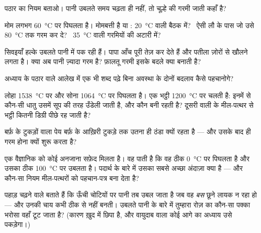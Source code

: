 \begin{exercise}[$\star$]\label{exo:g4:changes-of-state:4}
पठार का नियम बताओ। पानी उबलते समय  चढ़ता ही नहीं, तो चूल्हे की
गरमी जाती कहाँ है?
\end{exercise}

\begin{exercise}[$\star$]\label{exo:g4:changes-of-state:5}
मोम लगभग \qty{60}{\celsius} पर पिघलता है। मोमबत्ती  है या :
\qty{20}{\celsius} वाली बैठक में? \ ऐसी लौ के पास जो उसे
\qty{80}{\celsius} तक गरम कर दे? \ \qty{35}{\celsius} वाली गरमियों
की अटारी में?
\end{exercise}

\begin{exercise}[$\star$]\label{exo:g4:changes-of-state:6}
सिवइयाँ हल्के उबलते पानी में पक रही हैं। पापा आँच पूरी तेज़ कर देते
हैं और पतीला ज़ोरों से खौलने लगता है। क्या अब पानी ज़्यादा गरम है?
फ़ालतू गरमी इसके बदले क्या बनाती है?
\end{exercise}

\begin{exercise}[$\star$]\label{exo:g4:changes-of-state:7}
अध्याय के पठार वाले आलेख में एक भी शब्द पढ़े बिना अवस्था के दोनों
बदलाव कैसे पहचानोगे?
\end{exercise}

\begin{exercise}[$\star$]\label{exo:g4:changes-of-state:8}
लोहा \qty{1538}{\celsius} पर और सोना \qty{1064}{\celsius} पर
पिघलता है। एक भट्ठी \qty{1200}{\celsius} पर चलती है: इनमें से
कौन-सी धातु उसमें सूप की तरह उँडेली जाती है, और कौन  बनी रहती है?
दूसरी वाली के मील-पत्थर से भट्ठी कितनी डिग्री पीछे रह जाती है?
\end{exercise}

\begin{exercise}[$\star$]\label{exo:g4:changes-of-state:9}
बर्फ़ के टुकड़ों वाला पेय बर्फ़ के आख़िरी टुकड़े तक उतना ही ठंडा
क्यों रहता है --- और उसके बाद ही गरम होना क्यों शुरू करता है?
\end{exercise}

\begin{exercise}[$\star\star$]\label{exo:g4:changes-of-state:10}
एक वैज्ञानिक को कोई अनजाना सफ़ेद  मिलता है। वह पाती है कि वह ठीक
\qty{0}{\celsius} पर पिघलता है और उसका  ठीक \qty{100}{\celsius}
पर उबलता है। पदार्थ के बारे में उसका सबसे अच्छा अंदाज़ा क्या है ---
और कौन-सा नियम मील-पत्थरों को पहचान-पत्र बना देता है?
\end{exercise}

\begin{exercise}[$\star\star$]\label{exo:g4:changes-of-state:11}
पहाड़ चढ़ने वाले बताते हैं कि ऊँची चोटियों पर पानी तब उबल जाता है जब
वह \emph{बस} छूने लायक न रहा हो --- और उनकी चाय कभी ठीक से नहीं बनती।
उबलते पानी के बारे में तुम्हारा रोज़ का कौन-सा पक्का भरोसा वहाँ टूट
जाता है? (कारण ख़ुद  में छिपा है, और वायुदाब वाला कोई आगे का
अध्याय उसे पकड़ेगा।)
\end{exercise}
